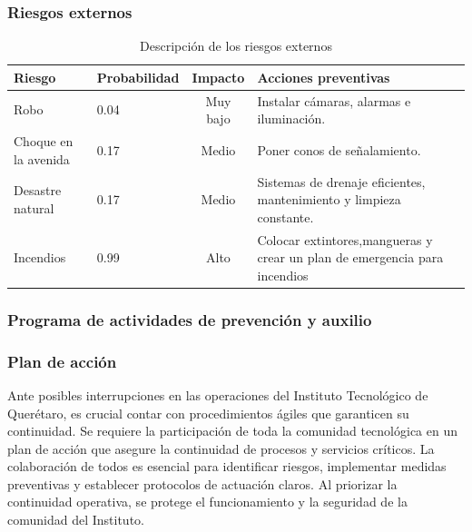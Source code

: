     \subsubsection{Riesgos externos}
    
     \begin{table}[H]
         \centering
    \caption{Descripción de los riesgos externos}
        \begin{tabular}{|p{4em}|p{6em}|c|p{6em}|}
             \hline
             \textbf{Riesgo}& \textbf{Probabilidad}& \textbf{Impacto}& \textbf{Acciones preventivas}\\
             \hline
             Robo & 0.04& Muy bajo& Instalar cámaras, alarmas e iluminación.\\
             \hline
              Choque en la avenida& 0.17 & Medio&Poner conos de señalamiento.\\
              \hline
              Desastre natural& 0.17& Medio& Sistemas de drenaje eficientes, mantenimiento y limpieza constante.\\
              \hline
             Incendios& 0.99& Alto& Colocar extintores,mangueras y crear un plan de emergencia para incendios\\      
              \hline
    
         \end{tabular}
         \label{tab:RiesgosExternos}
    \end{table}
    \subsubsection{Programa de actividades de prevención y auxilio}
    
    \subsubsection{Plan de acción}
    Ante posibles interrupciones en las operaciones del Instituto Tecnológico de Querétaro, es crucial contar con procedimientos ágiles que garanticen su continuidad. Se requiere la participación de toda la comunidad tecnológica en un plan de acción que asegure la continuidad de procesos y servicios críticos. La colaboración de todos es esencial para identificar riesgos, implementar medidas preventivas y establecer protocolos de actuación claros. Al priorizar la continuidad operativa, se protege el funcionamiento y la seguridad de la comunidad del Instituto.
    
